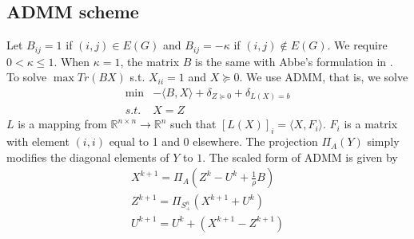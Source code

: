 \documentclass{ctexart}
\begin{document}
\subsection{ADMM scheme}
Let $B_{ij} = 1$ if $(i,j) \in E(G)$ and $B_{ij} = -\kappa$ if $(i,j) \not \in E(G)$.
We require $0<\kappa \leq 1$. When $\kappa = 1$, the matrix $B$ is the same with
Abbe's formulation in \cite{abbe2015exact}.
To solve $\max Tr(BX)$ s.t. $X_{ii} = 1$ and $X \succeq 0$.
We use ADMM, that is, we solve
\begin{align*}
\min & - \langle B, X\rangle + \delta_{Z \succeq 0} + \delta_{L(X) = b}\\
s.t.& X=Z
\end{align*}
$L$ is a mapping from $\mathbb{R}^{n \times n} \to \mathbb{R}^n$ such that $[L(X)]_i =  \langle X,F_i \rangle $.
$F_i$ is a matrix with element $(i,i)$ equal to 1 and 0 elsewhere.
The projection $\Pi_{A}(Y)$ simply modifies the diagonal elements of $Y$ to $1$.
The scaled form of ADMM \cite{boyd2011distributed} is given by
\begin{align}
X^{k+1} = \Pi_A(Z^k - U^k + \frac{1}{\rho}B) \\
Z^{k+1} = \Pi_{S_+^n}(X^{k+1} + U^{k}) \\
U^{k+1} = U^k + (X^{k+1} - Z^{k+1}) 
\end{align}
\end{document}
